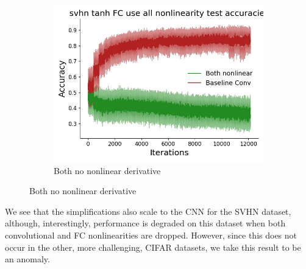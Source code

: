 \begin{figure}[htb]
\begin{subfigure}{0.25\textwidth}
  \includegraphics[width=\linewidth]{chapter_6_figures/AR/svhn_tanh_FC_use_all_nonlinearity_test_accuracies_prelim_1.jpg}
  \caption{Both no nonlinear derivative}
\end{subfigure}
\end{figure}

We see that the simplifications also scale to the CNN for the SVHN dataset, although, interestingly, performance is degraded on this dataset when both convolutional and FC nonlinearities are dropped. However, since this does not occur in the other, more challenging, CIFAR datasets, we take this result to be an anomaly.


